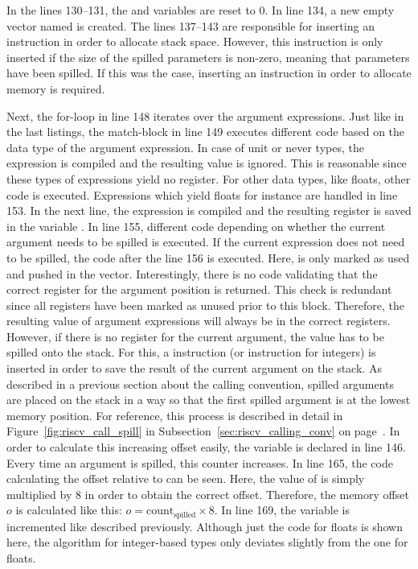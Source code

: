 In the lines 130--131, the  and  variables are reset to 0.
In line 134, a new empty vector named  is created.
The lines 137--143 are responsible for inserting an  instruction in order to allocate stack space.
However, this instruction is only inserted if the size of the spilled parameters is non-zero,
meaning that parameters have been spilled.
If this was the case, inserting an instruction in order to allocate memory is required.

Next, the for-loop in line 148 iterates over the argument expressions.
Just like in the last listings, the match-block in line 149 executes different code based on the data type of the argument expression.
In case of unit or never types, the expression is compiled and the resulting value is ignored.
This is reasonable since these types of expressions yield no register.
For other data types, like floats, other code is executed.
Expressions which yield floats for instance are handled in line 153.
In the next line, the expression is compiled and the resulting register is saved in the variable .
In line 155, different code depending on whether the current argument needs to be spilled is executed.
If the current expression does not need to be spilled, the code after the line 156 is executed.
Here,  is only marked as used and pushed in the  vector.
Interestingly, there is no code validating that the correct register for the argument position is returned.
This check is redundant since all registers have been marked as unused prior to this block.
Therefore, the resulting value of argument expressions will always be in the correct registers.
However, if there is no register for the current argument, the value has to be spilled onto the stack.
For this, a  instruction (or  instruction for integers) is inserted in order to save the result of the current argument on the stack.
As described in a previous section about the \riscv{} calling convention, spilled arguments are placed on the stack in a way so that the first spilled argument is at the lowest memory position.
For reference, this process is described in detail in Figure~\ref{fig:riscv_call_spill} in Subsection~\ref{sec:riscv_calling_conv} on page~\pageref{sec:riscv_calling_conv}.
In order to calculate this increasing offset easily, the  variable is declared in line 146.
Every time an argument is spilled, this counter increases.
In line 165, the code calculating the offset relative to  can be seen.
Here, the value of  is simply multiplied by 8 in order to obtain the correct offset.
Therefore, the memory offset $o$ is calculated like this: $o = \text{count}_\text{spilled} \times 8$.
In line 169, the  variable is incremented like described previously.
Although just the code for floats is shown here, the algorithm for integer-based types only deviates slightly from the one for floats.

